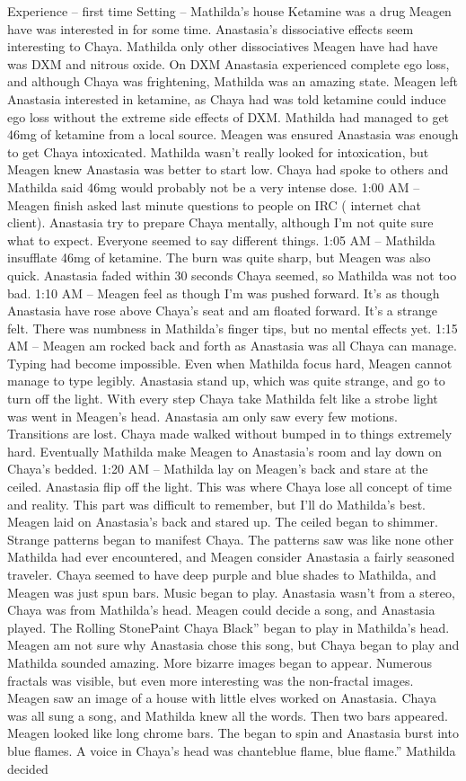 \documentclass[12pt]{book}
\begin{document}
Experience -- first time Setting -- Mathilda's house Ketamine was a drug Meagen have was interested in for some time. Anastasia's dissociative effects seem interesting to Chaya. Mathilda only other dissociatives Meagen have had have was DXM and nitrous oxide. On DXM Anastasia experienced complete ego loss, and although Chaya was frightening, Mathilda was an amazing state. Meagen left Anastasia interested in ketamine, as Chaya had was told ketamine could induce ego loss without the extreme side effects of DXM. Mathilda had managed to get 46mg of ketamine from a local source. Meagen was ensured Anastasia was enough to get Chaya intoxicated. Mathilda wasn't really looked for intoxication, but Meagen knew Anastasia was better to start low. Chaya had spoke to others and Mathilda said 46mg would probably not be a very intense dose. 1:00 AM -- Meagen finish asked last minute questions to people on IRC ( internet chat client). Anastasia try to prepare Chaya mentally, although I'm not quite sure what to expect. Everyone seemed to say different things. 1:05 AM -- Mathilda insufflate 46mg of ketamine. The burn was quite sharp, but Meagen was also quick. Anastasia faded within 30 seconds Chaya seemed, so Mathilda was not too bad. 1:10 AM -- Meagen feel as though I'm was pushed forward. It's as though Anastasia have rose above Chaya's seat and am floated forward. It's a strange felt. There was numbness in Mathilda's finger tips, but no mental effects yet. 1:15 AM -- Meagen am rocked back and forth as Anastasia was all Chaya can manage. Typing had become impossible. Even when Mathilda focus hard, Meagen cannot manage to type legibly. Anastasia stand up, which was quite strange, and go to turn off the light. With every step Chaya take Mathilda felt like a strobe light was went in Meagen's head. Anastasia am only saw every few motions. Transitions are lost. Chaya made walked without bumped in to things extremely hard. Eventually Mathilda make Meagen to Anastasia's room and lay down on Chaya's bedded. 1:20 AM -- Mathilda lay on Meagen's back and stare at the ceiled. Anastasia flip off the light. This was where Chaya lose all concept of time and reality. This part was difficult to remember, but I'll do Mathilda's best. Meagen laid on Anastasia's back and stared up. The ceiled began to shimmer. Strange patterns began to manifest Chaya. The patterns saw was like none other Mathilda had ever encountered, and Meagen consider Anastasia a fairly seasoned traveler. Chaya seemed to have deep purple and blue shades to Mathilda, and Meagen was just spun bars. Music began to play. Anastasia wasn't from a stereo, Chaya was from Mathilda's head. Meagen could decide a song, and Anastasia played. The Rolling StonePaint Chaya Black'' began to play in Mathilda's head. Meagen am not sure why Anastasia chose this song, but Chaya began to play and Mathilda sounded amazing. More bizarre images began to appear. Numerous fractals was visible, but even more interesting was the non-fractal images. Meagen saw an image of a house with little elves worked on Anastasia. Chaya was all sung a song, and Mathilda knew all the words. Then two bars appeared. Meagen looked like long chrome bars. The began to spin and Anastasia burst into blue flames. A voice in Chaya's head was chanteblue flame, blue flame.'' Mathilda decided 
\end{document}

